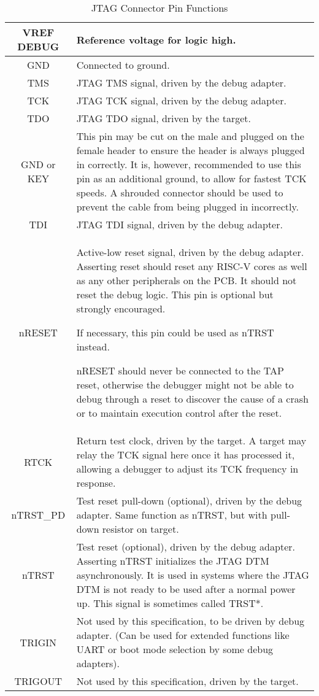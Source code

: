 \begin{table}[htp]
    \centering
    \caption{JTAG Connector Pin Functions}
    \label{tab:pinout}
    \begin{tabulary}{\textwidth}{|c|L|}
      \hline
      VREF DEBUG & Reference voltage for logic high. \\
      \hline
      GND & Connected to ground. \\
      \hline
      TMS & JTAG TMS signal, driven by the debug adapter. \\
      \hline
      TCK & JTAG TCK signal, driven by the debug adapter. \\
      \hline
      TDO & JTAG TDO signal, driven by the target. \\
      \hline
      GND or KEY &
        This pin may be cut on the male and plugged on the female header to
        ensure the header is always plugged in correctly. It is, however,
        recommended to use this pin as an additional ground, to allow for
        fastest TCK speeds. A shrouded connector should be used to prevent the
        cable from being plugged in incorrectly. \\
      \hline
      TDI & JTAG TDI signal, driven by the debug adapter. \\
      \hline
      nRESET & Active-low reset signal, driven by the debug adapter.
        Asserting reset should reset any RISC-V cores as well as any other
        peripherals on the PCB. It should not reset the debug logic.  This pin
        is optional but strongly encouraged.

        If necessary, this pin could be used as nTRST instead.

        nRESET should never be connected to the TAP reset, otherwise the
        debugger might not be able to debug through a reset to discover the
        cause of a crash or to maintain execution control after the reset. \\
      \hline
      RTCK & Return test clock, driven by the target. A target may relay
        the TCK signal here once it has processed it, allowing a debugger to
        adjust its TCK frequency in response. \\
      \hline
      nTRST\_PD & Test reset pull-down (optional), driven by the debug
        adapter. Same function as nTRST, but with pull-down resistor on target.
        \\
      \hline
      nTRST & Test reset (optional), driven by the debug adapter. Asserting
        nTRST initializes the JTAG DTM asynchronously. It is used in systems
        where the JTAG DTM is not ready to be used after a normal power up. This
        signal is sometimes called TRST*. \\
      \hline
      TRIGIN & Not used by this specification, to be driven by debug
        adapter.  (Can be used for extended functions like UART or boot mode
        selection by some debug adapters). \\
      \hline
      TRIGOUT & Not used by this specification, driven by the target. \\
      \hline
    \end{tabulary}
\end{table}

